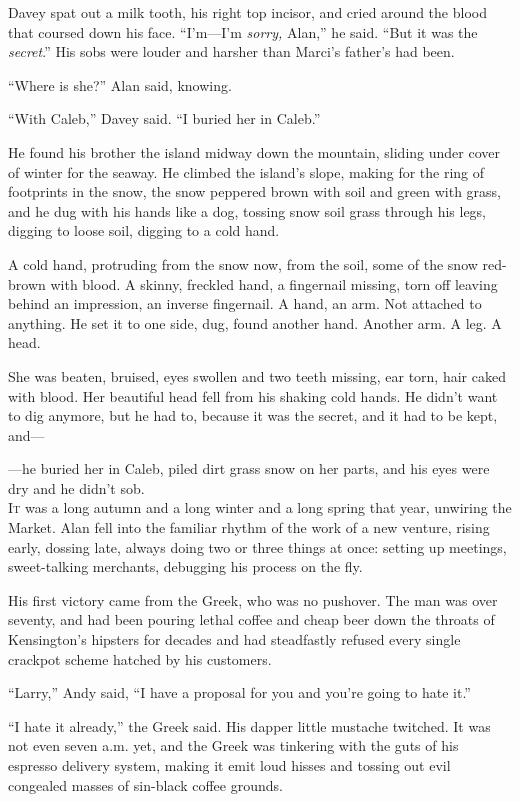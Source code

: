 \documentclass{article}
\begin{document}
Davey spat out a milk tooth, his right top incisor, and cried around
the blood that coursed down his face.  ``I'm---I'm \textit{sorry,}
Alan,'' he said.  ``But it was the \textit{secret}.'' His sobs were
louder and harsher than Marci's father's had been.

``Where is she?'' Alan said, knowing.

``With Caleb,'' Davey said.  ``I buried her in Caleb.''

He found his brother the island midway down the mountain, sliding
under cover of winter for the seaway.  He climbed the island's slope,
making for the ring of footprints in the snow, the snow peppered brown
with soil and green with grass, and he dug with his hands like a dog,
tossing snow soil grass through his legs, digging to loose soil,
digging to a cold hand.

A cold hand, protruding from the snow now, from the soil, some of the
snow red-brown with blood.  A skinny, freckled hand, a fingernail
missing, torn off leaving behind an impression, an inverse fingernail. 
A hand, an arm.  Not attached to anything.  He set it to one side,
dug, found another hand.  Another arm.  A leg.  A head.

She was beaten, bruised, eyes swollen and two teeth missing, ear torn,
hair caked with blood.  Her beautiful head fell from his shaking cold
hands.  He didn't want to dig anymore, but he had to, because it was
the secret, and it had to be kept, and---

---he buried her in Caleb, piled dirt grass snow on her parts, and his
eyes were dry and he didn't sob.
\\
\lettrine[lines=3, lhang=.5, nindent=0pt, findent=2pt]{I}{t} was a long autumn and a long winter and a long spring that year,
unwiring the Market.  Alan fell into the familiar rhythm of the work
of a new venture, rising early, dossing late, always doing two or
three things at once:  setting up meetings, sweet-talking merchants,
debugging his process on the fly.

His first victory came from the Greek, who was no pushover.  The man
was over seventy, and had been pouring lethal coffee and cheap beer
down the throats of Kensington's hipsters for decades and had
steadfastly refused every single crackpot scheme hatched by his
customers.

``Larry,'' Andy said, ``I have a proposal for you and you're going to
hate it.''

``I hate it already,'' the Greek said.  His dapper little mustache
twitched.  It was not even seven a.m.  yet, and the Greek was
tinkering with the guts of his espresso delivery system, making it
emit loud hisses and tossing out evil congealed masses of sin-black
coffee grounds.
\end{document}
